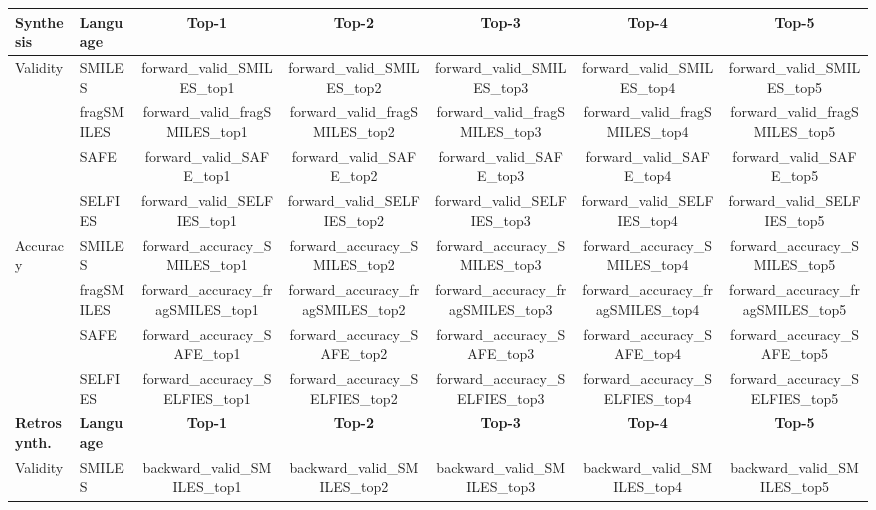 \begin{tabular}{llccccc}
    \toprule
    \textbf{Synthesis} & \textbf{Language} & \textbf{Top-1} & \textbf{Top-2} & \textbf{Top-3} & \textbf{Top-4} & \textbf{Top-5} \\
    \toprule
    Validity & SMILES & {{ forward_valid_SMILES_top1 }} & {{ forward_valid_SMILES_top2 }} & {{ forward_valid_SMILES_top3 }} & {{ forward_valid_SMILES_top4 }} & {{ forward_valid_SMILES_top5 }} \\
    ~ & fragSMILES & {{ forward_valid_fragSMILES_top1 }} & {{ forward_valid_fragSMILES_top2 }} & {{ forward_valid_fragSMILES_top3 }} & {{ forward_valid_fragSMILES_top4 }} & {{ forward_valid_fragSMILES_top5 }} \\
    ~ & SAFE & {{ forward_valid_SAFE_top1 }} & {{ forward_valid_SAFE_top2 }} & {{ forward_valid_SAFE_top3 }} & {{ forward_valid_SAFE_top4 }} & {{ forward_valid_SAFE_top5 }} \\
    ~ & SELFIES & {{ forward_valid_SELFIES_top1 }} & {{ forward_valid_SELFIES_top2 }} & {{ forward_valid_SELFIES_top3 }} & {{ forward_valid_SELFIES_top4 }} & {{ forward_valid_SELFIES_top5 }} \\
    \hline
    Accuracy & SMILES & {{ forward_accuracy_SMILES_top1 }} & {{ forward_accuracy_SMILES_top2 }} & {{ forward_accuracy_SMILES_top3 }} & {{ forward_accuracy_SMILES_top4 }} & {{ forward_accuracy_SMILES_top5 }} \\
    ~ & fragSMILES & {{ forward_accuracy_fragSMILES_top1 }} & {{ forward_accuracy_fragSMILES_top2 }} & {{ forward_accuracy_fragSMILES_top3 }} & {{ forward_accuracy_fragSMILES_top4 }} & {{ forward_accuracy_fragSMILES_top5 }} \\
    ~ & SAFE & {{ forward_accuracy_SAFE_top1 }} & {{ forward_accuracy_SAFE_top2 }} & {{ forward_accuracy_SAFE_top3 }} & {{ forward_accuracy_SAFE_top4 }} & {{ forward_accuracy_SAFE_top5 }} \\
    ~ & SELFIES & {{ forward_accuracy_SELFIES_top1 }} & {{ forward_accuracy_SELFIES_top2 }} & {{ forward_accuracy_SELFIES_top3 }} & {{ forward_accuracy_SELFIES_top4 }} & {{ forward_accuracy_SELFIES_top5 }} \\
    \toprule
    \textbf{Retrosynth.} &  \textbf{Language} & \textbf{Top-1} & \textbf{Top-2} & \textbf{Top-3} & \textbf{Top-4} & \textbf{Top-5}\\
    \toprule
    Validity & SMILES & {{ backward_valid_SMILES_top1 }} & {{ backward_valid_SMILES_top2 }} & {{ backward_valid_SMILES_top3 }} & {{ backward_valid_SMILES_top4 }} & {{ backward_valid_SMILES_top5 }} \\

\end{tabular}
